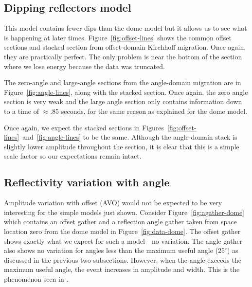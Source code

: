 

\par
\subsection{Dipping reflectors model}

This model contains fewer dips than the dome model but it allows us to 
see what is happening at later times.  Figure~\ref{fig:offset-lines} 
shows the common offset sections  and stacked section from offset-domain 
Kirchhoff migration.  Once again, they are practically perfect.  The only 
problem is near the bottom of the section where we lose energy because the
data was truncated.

The zero-angle and large-angle sections from the angle-domain migration are
in Figure~\ref{fig:angle-lines}, along with the stacked section.  Once 
again, the zero angle section is very weak and the large angle section only
contains information down to a time of $\approx .85$ seconds, for the same
reason as explained for the dome model.  

Once again, we expect the stacked sections in 
Figures~\ref{fig:offset-lines}~and~\ref{fig:angle-lines} to be the same. 
Although the angle-domain stack is slightly lower amplitude throughout the
section, it is clear that this is a simple scale factor so our expectations
remain intact. 



\par
\subsection{Reflectivity variation with angle}

Amplitude variation with offset (AVO) would not be expected to be very
interesting for the simple models just shown.  Consider
Figure~\ref{fig:agather-dome} which contains an offset gather and a
reflection angle gather taken from space location zero from the dome
model in Figure~\ref{fig:data-dome}.  The offset gather shows exactly
what we expect for such a model - no variation.  The angle gather also
shows no variation for angles less than the maximum useful angle
($25^{\circ}$) as discussed in the previous two subsections.  However,
when the angle exceeds the maximum useful angle, the event increases
in amplitude and width.  This is the phenomenon seen in
\cite{GEO55-09-12231234}. 

